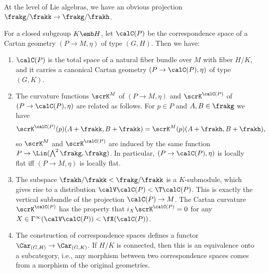 At the level of Lie algebras, we have an obvious projection $\frakg\slash\frakk\to \frakg\slash\frakh$.

\begin{prop}
    For a closed subgroup $K\emb H$, let $\calC(P)$ be the correspondence space of a Cartan geometry $(P\to M,\eta)$ of type $(G,H)$. Then we have:
    \begin{enumerate}[label=(\arabic*)]
        \item $\calC(P)$ is the total space of a natural fiber bundle over $M$ with fiber $H\slash K$, and it carries a canonical Cartan geometry $(P\to \calC(P),\eta)$ of type $(G,K)$.
        \item The curvature functions $\scrK^M$ of $(P\to M,\eta)$ and $\scrK^{\calC(P)}$ of $(P\to \calC(P),\eta)$ are related as follows. For $p\in P$ and $A,B\in\frakg$ we have 
        \[\scrK^{\calC(P)}(p)(A+\frakk,B+\frakk)=\scrK^M(p)(A+\frakh,B+\frakh),\]
        so $\scrK^M$ and $\scrK^{\calC(P)}$ are induced by the same function $P\to \Lin(\bigwedge^2\frakg,\frakg)$. In particular, $(P\to \calC(P),\eta)$ is locally flat iff $(P\to M,\eta)$ is locally flat.
        \item The subspace $\frakh\slash\frakk< \frakg\slash \frakk$ is a $K$-submodule, which gives rise to a distribution $\calV\calC(P)<\T \calC(P)$. This is exactly the vertical subbundle of the projection $\calC(P)\to M$. The Cartan curvature $\scrK^{\calC(P)}$ has the property that $i_X \scrK^{\calC(P)}=0$ for any $X\in\Gamma^\infty(\calV\calC(P))<\fX(\calC(P))$.
        \item The construction of correspondence spaces defines a functor $\Car_{(G,H)}\to \Car_{(G,K)}$. If $H\slash K$ is connected, then this is an equivalence onto a subcategory, i.e., any morphism between two correspondence spaces comes from a morphism of the original geometries.
    \end{enumerate}
\end{prop}
